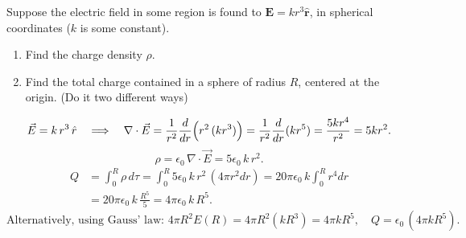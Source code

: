 \begin{hwkProblem}{2.9}{}

	Suppose the electric field in some region is found to \( \mathbf{E} = k r^3 \mathbf{\hat{r}} \), in spherical coordinates (\( k \) is some constant).
	\begin{enumerate}
		\item Find the charge density \( \rho \).
		\item Find the total charge contained in a sphere of radius \( R \), centered at the origin. (Do it two different ways)
	\end{enumerate}

	\hwkSol

	\hwkPart
	\[
	\vec{E}=k\,r^3\,\hat{r}\quad\Longrightarrow\quad
	\nabla\cdot\vec{E}=\frac{1}{r^2}\frac{d}{dr}\Bigl(r^2\,(kr^3)\Bigr)
	=\frac{1}{r^2}\frac{d}{dr}(kr^5)
	=\frac{5kr^4}{r^2}=5kr^2.
	\]
	\[
	\rho=\epsilon_0\,\nabla\cdot\vec{E}=5\epsilon_0\,k\,r^2.
	\]
	\hwkPart
	\[
	\begin{aligned}
	Q&=\int_0^R\rho\,d\tau
	=\int_0^R5\epsilon_0\,k\,r^2\,(4\pi r^2dr)
	=20\pi\epsilon_0\,k\int_0^Rr^4dr\\[1mm]
	&=20\pi\epsilon_0\,k\,\frac{R^5}{5}
	=4\pi\epsilon_0\,k\,R^5.
	\end{aligned}
	\]
	\[
	\text{Alternatively, using Gauss' law: }
	4\pi R^2E(R)=4\pi R^2(kR^3)=4\pi kR^5,\quad
	Q=\epsilon_0\,(4\pi kR^5).
	\]

\end{hwkProblem}

